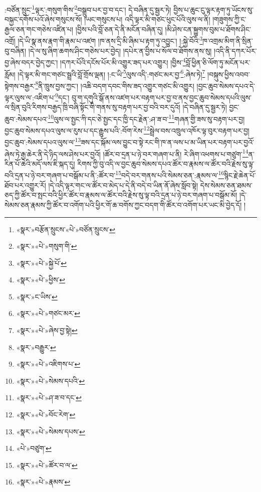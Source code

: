 :བཙོན་སྲུང་\footnote{«སྣར་»བརྩོན་སྲུངས་«པེ་»བཙོན་སྲུངས་}ལྟར་:གསུག་གིས་\footnote{«སྣར་»«པེ་»གསུག་གི་}བསྒྲུབ་པར་བྱ་བ་དང་། དེ་བཞིན་དུ་སྦྱར་ཏེ། བྱིས་པ་ཆུང་ངུ་ལྟར་རྟག་ཏུ་ཡོངས་སུ་བསྐྱང་དགོས་པའོ་ཞེས་གསུངས་སོ། །ཡང་གསུངས་པ། འདི་ལྟར་མི་གཙང་ཕུང་པོའི་ལུས་ལ་ནི། །གཟུགས་ཀྱི་ང་རྒྱལ་ཅན་གང་གཅེས་འཛིན་པ། །བྱིས་པའི་བློ་ཅན་དེ་ནི་མངོན་བཞིན་དུ། །མི་ཤེས་ངན་སྐྱུགས་བུམ་པ་ཐོགས་ཤིང་འགྲོ། །དེ་ཡི་སྣ་ནས་རྣག་གི་རྣམ་པ་འཛག །ཁ་ནས་དྲི་མི་ཞིམ་པ་རྟག་ཏུ་འབྱུང་། །:སྐྱེ་བོའི་\footnote{«སྣར་»«པེ་»སྐྱེ་པོ་}ཁ་འགྲམ་མིག་ནི་སྲིན་བུ་བཞིན། །དེ་ལ་སུ་ཞིག་ཆགས་ཤིང་གཅེས་པར་བྱེད། །དཔེར་ན་བྱིས་པ་སོལ་བ་ཐོགས་ནས་སུ། །འདི་ནི་དཀར་པོར་བྱ་ཞེས་བདར་བྱེད་ཀྱང་། །དཀར་པོའི་དངོས་པོར་མི་འགྱུར་ཟད་པར་འགྱུར། །བྱིས་\footnote{«སྣར་»«པེ་»ཕྱིས་}བློ་ཕྱིན་ཅི་ལོག་ཏུ་མངོན་པར་རློམ། །དེ་ལྟར་མི་གང་གཙང་སྦྲའི་བློ་གྲོས་ལྡན། །:ང་ཡི་\footnote{«སྣར་»ང་ཡིས་}ལུས་འདི་:གཙང་མར་བྱ་\footnote{«སྣར་»«པེ་»གཙང་མར་}:ཞེས་ཏེ།\footnote{«སྣར་»«པེ་»ཞེས་བྱ་སྟེ།} །བསྐུས་ཕྱིས་འབབ་སྟེགས་བརྒྱར་\footnote{«སྣར་»བརྒྱུར་}ནི་ཁྲུས་བྱས་ཀྱང་། །འཆི་བདག་དབང་གིས་ཟད་འགྱུར་གཙང་མི་འགྱུར། །བྱང་ཆུབ་སེམས་དཔའ་དེ་ལྟར་ལུས་ལ་:འཇིག་པ་\footnote{«སྣར་»«པེ་»འཇིགས་པ་}དང་། བུ་ག་དགུའི་སྒོ་ནས་འཛག་པར་བརྟག་པར་བྱ་བ་ནས་བྱང་ཆུབ་སེམས་དཔའི་ལུས་ལ་སྲིན་བུའི་རིགས་བརྒྱད་ཁྲི་བཞི་སྟོང་གི་གནས་སུ་བརྟག་པར་བྱ་བའི་བར་དུའོ། །དེ་བཞིན་དུ་སྦྱར་ཏེ། བྱང་ཆུབ་:སེམས་དཔའ་\footnote{«སྣར་»«པེ་»སེམས་དཔའི་}ལུས་ལ་སྤྱང་ཀི་དང་ཅེ་སྤྱང་དང་ཁྱི་དང་རྗེན་:ཤ་ཟ་བ་\footnote{«སྣར་»«པེ་»ཤ་ཟ་བ་དང་}གཞན་གྱི་ཟས་སུ་བརྟག་པར་བྱ། བྱང་ཆུབ་སེམས་དཔའ་ལུས་ལ་རུས་པ་དང་རྒྱུས་པའི་:བོག་རེས་\footnote{«སྣར་»«པེ་»བོང་རེག་}སྦྲེལ་བས་འཁྲུལ་འཁོར་ལྟ་བུར་བརྟག་པར་བྱ། བྱང་ཆུབ་:སེམས་དཔའ་ལུས་ལ་\footnote{«སྣར་»«པེ་»སེམས་དཔས་}ཟས་དང་སྐོམ་ལས་བྱུང་བ་སྟེ་རང་གི་ཁ་ན་ལས་པ་མ་ཡིན་པར་བརྟག་པར་བྱའོ་ཞེས་ཏེ་རྒྱ་ཆེར་ནི་དེ་ཉིད་ལས་ཤེས་པར་བྱའོ། །ཚོར་བ་དྲན་པ་ཉེ་བར་གཞག་པ་ནི། རེ་ཞིག་འཕགས་པ་གཙུག་\footnote{«པེ་»བཙུག་}ན་རིན་པོ་ཆེའི་མདོ་ལས་ཇི་སྐད་དུ། རིགས་ཀྱི་བུ་འདི་ལ་བྱང་ཆུབ་སེམས་དཔའ་ཚོར་བ་རྣམས་ལ་ཚོར་བའི་རྗེས་སུ་ལྟ་བའི་དྲན་པ་ཉེ་བར་གཞག་པ་བསྒོམ་པ་ནི་:ཚོར་བ་\footnote{«སྣར་»«པེ་»ཚོར་བ་ལ་}བདེ་བར་གནས་པའི་སེམས་ཅན་:རྣམས་ལ་\footnote{«སྣར་»«པེ་»རྣམས་}སྙིང་རྗེ་ཆེན་པོ་ཐོབ་པར་འགྱུར་རོ། །དེ་འདི་ལྟར་གང་ལ་ཚོར་བ་མེད་པ་དེ་ནི་བདེ་བ་ཡིན་ནོ་ཞེས་སློབ་སྟེ། དེས་སེམས་ཅན་ཐམས་ཅད་ཀྱི་ཚོར་བ་སྤང་བའི་ཕྱིར་ཚོར་བ་རྣམས་ལ་ཚོར་བའི་རྗེས་སུ་ལྟ་བའི་དྲན་པ་ཉེ་བར་གཞག་པ་བསྒོམ་མོ། །དེ་སེམས་ཅན་རྣམས་ཀྱི་ཚོར་བ་འགོག་པའི་ཕྱིར་གོ་ཆ་བགོས་ཀྱང་བདག་གི་ཚོར་བ་འགོག་པར་ཡང་མི་བྱེད་དོ། །
